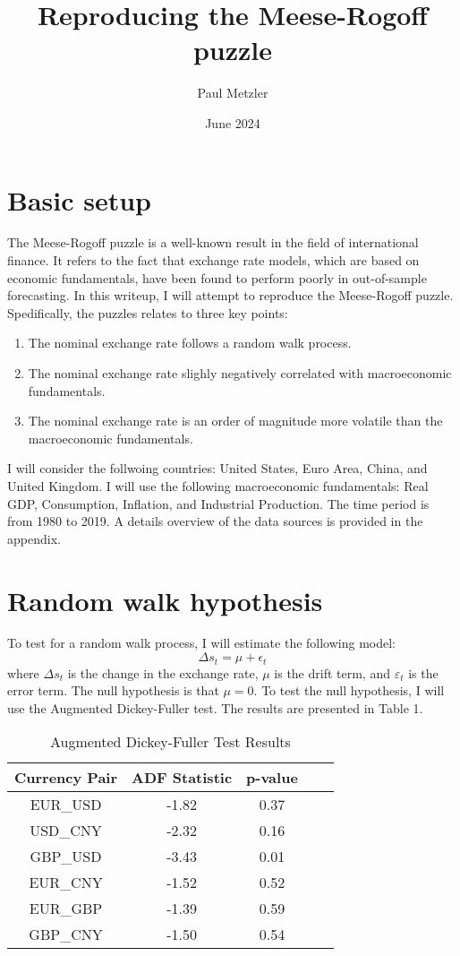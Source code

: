 \documentclass{article}
\title{Reproducing the Meese-Rogoff puzzle}
\author{Paul Metzler}
\date{June 2024}
\begin{document}
\maketitle

\section{Basic setup}

The Meese-Rogoff puzzle is a well-known result in the field of international finance. It refers to the fact that exchange rate models, which are based on economic fundamentals, have been found to perform poorly in out-of-sample forecasting. In this writeup, I will attempt to reproduce the Meese-Rogoff puzzle.
Spedifically, the puzzles relates to three key points:
\begin{enumerate}
    \item The nominal exchange rate follows a random walk process.
    \item The nominal exchange rate slighly negatively correlated with macroeconomic fundamentals.
    \item The nominal exchange rate is an order of magnitude more volatile than the macroeconomic fundamentals.
\end{enumerate}

I will consider the follwoing countries: United States, Euro Area, China, and United Kingdom. I will use the following macroeconomic fundamentals: Real GDP, Consumption, Inflation, and Industrial Production. The time period is from 1980 to 2019.
A details overview of the data sources is provided in the appendix.

\section{Random walk hypothesis}

To test for a random walk process, I will estimate the following model:
\begin{equation}
    \Delta s_t = \mu + \epsilon_t
\end{equation}
where $\Delta s_t$ is the change in the exchange rate, $\mu$ is the drift term, and $\varepsilon_t$ is the error term. The null hypothesis is that $\mu = 0$.
To test the null hypothesis, I will use the Augmented Dickey-Fuller test. The results are presented in Table 1.

\begin{table}[H]
    \centering
    \caption{Augmented Dickey-Fuller Test Results}
    \begin{tabular}{ccccc}
        \hline
        Currency Pair & ADF Statistic & p-value \\
        \hline
        EUR\_USD & -1.82 & 0.37 \\
        USD\_CNY & -2.32 & 0.16 \\
        GBP\_USD & -3.43 & 0.01 \\
        EUR\_CNY & -1.52 & 0.52 \\
        EUR\_GBP & -1.39 & 0.59 \\
        GBP\_CNY & -1.50 & 0.54 \\
        \hline
    \end{tabular}
\end{table}
\end{document}
